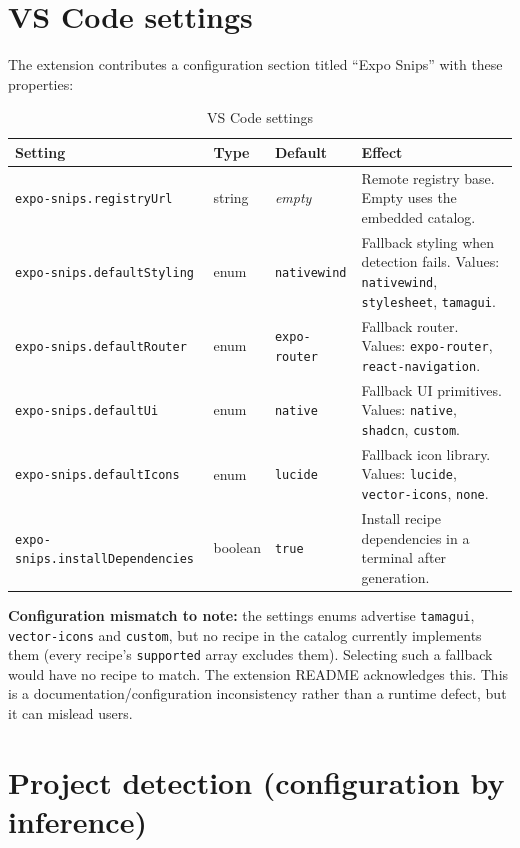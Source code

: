 \section{VS Code settings}

The extension contributes a configuration section titled ``Expo Snips'' with
these properties:

\begin{longtable}{p{4.2cm}p{1.8cm}p{2.4cm}p{5.8cm}}
\caption{VS Code settings}\\
\toprule
\textbf{Setting} & \textbf{Type} & \textbf{Default} & \textbf{Effect} \\
\midrule

\texttt{expo-snips.registryUrl} & string & \textit{empty} & Remote registry base.
Empty uses the embedded catalog. \\
\texttt{expo-snips.defaultStyling} & enum & \texttt{nativewind} & Fallback styling
when detection fails. Values: \texttt{nativewind}, \texttt{stylesheet},
\texttt{tamagui}. \\
\texttt{expo-snips.defaultRouter} & enum & \texttt{expo-router} & Fallback router.
Values: \texttt{expo-router}, \texttt{react-navigation}. \\
\texttt{expo-snips.defaultUi} & enum & \texttt{native} & Fallback UI primitives.
Values: \texttt{native}, \texttt{shadcn}, \texttt{custom}. \\
\texttt{expo-snips.defaultIcons} & enum & \texttt{lucide} & Fallback icon library.
Values: \texttt{lucide}, \texttt{vector-icons}, \texttt{none}. \\
\texttt{expo-snips.installDependencies} & boolean & \texttt{true} & Install
recipe dependencies in a terminal after generation. \\
\bottomrule
\end{longtable}

\textbf{Configuration mismatch to note:} the settings enums advertise
\texttt{tamagui}, \texttt{vector-icons} and \texttt{custom}, but no recipe in the
catalog currently implements them (every recipe's \texttt{supported} array
excludes them). Selecting such a fallback would have no recipe to match. The
extension README acknowledges this. This is a documentation/configuration
inconsistency rather than a runtime defect, but it can mislead users.

\section{Project detection (configuration by inference)}

